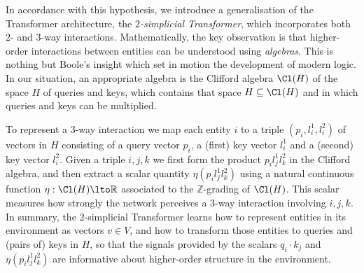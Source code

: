 \documentclass{article} %
\begin{document}
In accordance with this hypothesis, we introduce a generalisation of the Transformer architecture, the \emph{$2$-simplicial Transformer}, which incorporates both $2$- and $3$-way interactions. Mathematically, the key observation is that higher-order interactions between entities can be understood using \emph{algebras}. This is nothing but Boole's insight \citep{boole} which set in motion the development of modern logic. In our situation, an appropriate algebra is the Clifford algebra $\Cl(H)$ of the space $H$ of queries and keys, which contains that space $H \subseteq \Cl(H)$ and in which queries and keys can be multiplied. 

To represent a $3$-way interaction we map each entity $i$ to a triple $(p_i, l^1_i, l^2_i)$ of vectors in $H$ consisting of a query vector $p_i$, a (first) key vector $l^1_i$ and a (second) key vector $l^2_i$. Given a triple $i,j,k$ we first form the product $p_i l^1_j l^2_k$ in the Clifford algebra, and then extract a scalar quantity $\eta(p_i l^1_j l^2_k)$ using a natural continuous function $\eta: \Cl(H) \lto \mathbb{R}$ associated to the $\mathbb{Z}$-grading of $\Cl(H)$. This scalar measures how strongly the network perceives a $3$-way interaction involving $i,j,k$. In summary, the $2$-simplicial Transformer learns how to represent entities in its environment as vectors $v \in V$, and how to transform those entities to queries and (pairs of) keys in $H$, so that the signals provided by the scalars $q_i\cdot k_j$ and $\eta(p_i l^1_j l^2_k)$ are informative about higher-order structure in the environment.


\end{document}
